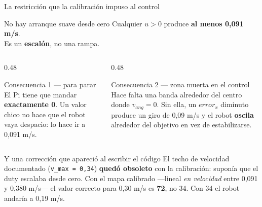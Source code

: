 \documentclass[aspectratio=169,10pt]{beamer}
\begin{document}
\begin{frame}{La restricción que la calibración impuso al control}
  \begin{alertblock}{No hay arranque suave desde cero}
    \centering\large
    Cualquier $u > 0$ produce \textbf{al menos 0,091 m/s}.\\[0.3em]
    \normalsize Es un \textbf{escalón}, no una rampa.
  \end{alertblock}

  \vspace{0.7em}
  \begin{columns}[T,onlytextwidth]
    \begin{column}{0.48\textwidth}
      \begin{block}{Consecuencia 1 --- para parar}
        \small
        El Pi tiene que mandar \textbf{exactamente 0}. Un valor chico no hace que
        el robot vaya despacio: lo hace ir a 0,091 m/s.
      \end{block}
    \end{column}
    \begin{column}{0.48\textwidth}
      \begin{block}{Consecuencia 2 --- zona muerta en el control}
        \small
        Hace falta una banda alrededor del centro donde $v_{ang} = 0$. Sin ella,
        un $error_x$ diminuto produce un giro de 0,09 m/s y el robot
        \textbf{oscila} alrededor del objetivo en vez de estabilizarse.
      \end{block}
    \end{column}
  \end{columns}

  \vspace{0.6em}
  \begin{block}{Y una corrección que apareció al escribir el código}
    \small
    El techo de velocidad documentado (\texttt{v\_max = 0,34}) \textbf{quedó
    obsoleto} con la calibración: suponía que el duty escalaba desde cero. Con el
    mapa calibrado ---lineal \emph{en velocidad} entre 0,091 y 0,380 m/s--- el
    valor correcto para 0,30 m/s es \textbf{72}, no 34. Con 34 el robot andaría a
    0,19 m/s.
  \end{block}
\end{frame}
\end{document}
